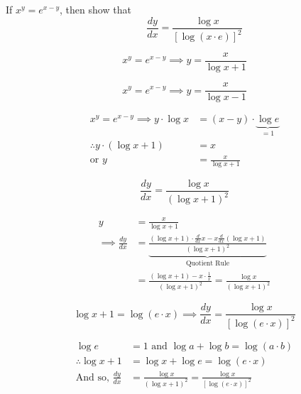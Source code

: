 \documentclass[14pt,fleqn]{extarticle}
\begin{document}
If $x^y = e^{x-y}$, then show that
\[\qquad \frac{dy}{dx} = \frac{\log x}{\left[\log \left(x\cdot e \right) \right]^2}\]
%

\newcard

\[ x^y = e^{x-y} \implies y = \frac{x}{\log x + 1}\]

\newcard 

\[ x^y = e^{x-y} \implies y = \frac{x}{\log x - 1}\]

\newcard 

\begin{align}
	x^y = e^{x-y} \implies y\cdot \log x &= \left(x-y \right)\cdot \underbrace{\log e}_{=1} \\
	\therefore y\cdot \left(\log x + 1 \right) &= x \\
	\text{or } y &= \frac{x}{\log x + 1}
\end{align}

\newcard 

\[ \frac{dy}{dx} = \frac{\log x}{\left(\log x + 1 \right)^2}\]

\newcard 

\begin{align}
	y &= \frac{x}{\log x + 1} \\ 
	\implies \frac{dy}{dx} &= \underbrace{\frac{\left(\log x +1 \right)\cdot \frac{d}{dx} x - x \frac{d}{dx}\left(\log x + 1 \right)}{\left(\log x + 1 \right)^2}}_{\text{Quotient Rule}} \\
	&= \frac{\left(\log x + 1 \right) - x\cdot \frac{1}{x}}{\left(\log x + 1 \right)^2} = \frac{\log x}{\left(\log x + 1 \right)^2}
\end{align}

\newcard 

\[ \log x + 1 = \log \left(e\cdot x \right) \implies \frac{dy}{dx} = \frac{\log x}{\left[\log \left(e\cdot x \right) \right]^2}\]

\newcard 

\begin{align}
\log e &= 1 \text{ and } \log a + \log b = \log \left(a\cdot b \right) \\
\therefore \log x + 1 &= \log x + \log e = \log \left(e\cdot x \right) \\
\text{And so, } \frac{dy}{dx} &= \frac{\log x}{\left(\log x + 1 \right)^2} = \frac{\log x}{\left[\log \left(e\cdot x \right) \right]^2}
\end{align}
\end{document}
